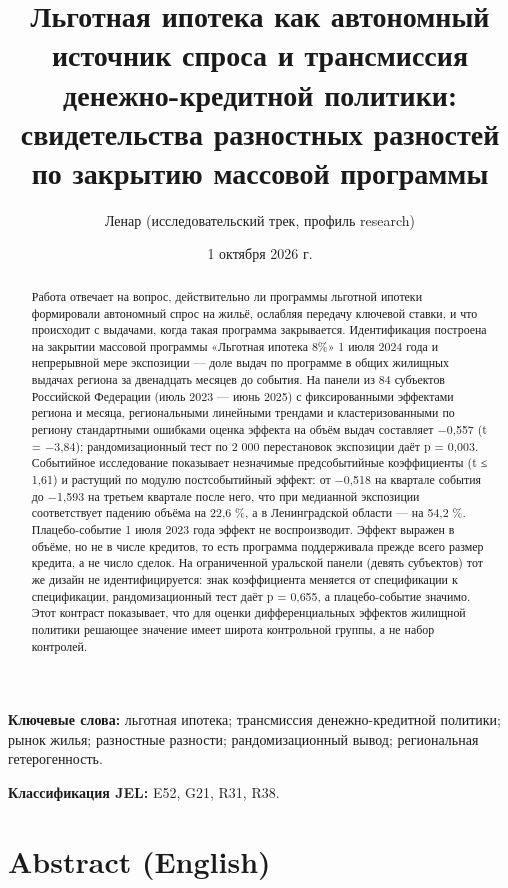 \documentclass[
  russian,
  11pt,
]{article}
\title{Льготная ипотека как автономный источник спроса и трансмиссия
денежно-кредитной политики: свидетельства разностных разностей по
закрытию массовой программы}
\author{Ленар (исследовательский трек, профиль research)}
\date{1 октября 2026 г.}
\begin{document}
\maketitle
\begin{abstract}
Работа отвечает на вопрос, действительно ли программы льготной ипотеки
формировали автономный спрос на жильё, ослабляя передачу ключевой
ставки, и что происходит с выдачами, когда такая программа закрывается.
Идентификация построена на закрытии массовой программы «Льготная ипотека
8\%» 1 июля 2024 года и непрерывной мере экспозиции --- доле выдач по
программе в общих жилищных выдачах региона за двенадцать месяцев до
события. На панели из 84 субъектов Российской Федерации (июль 2023 ---
июнь 2025) с фиксированными эффектами региона и месяца, региональными
линейными трендами и кластеризованными по региону стандартными ошибками
оценка эффекта на объём выдач составляет −0,557 (t = −3,84);
рандомизационный тест по 2 000 перестановок экспозиции даёт p = 0,003.
Событийное исследование показывает незначимые предсобытийные
коэффициенты (\textbar t\textbar{} ≤ 1,61) и растущий по модулю
постсобытийный эффект: от −0,518 на квартале события до −1,593 на
третьем квартале после него, что при медианной экспозиции соответствует
падению объёма на 22,6 \%, а в Ленинградской области --- на 54,2 \%.
Плацебо-событие 1 июля 2023 года эффект не воспроизводит. Эффект выражен
в объёме, но не в числе кредитов, то есть программа поддерживала прежде
всего размер кредита, а не число сделок. На ограниченной уральской
панели (девять субъектов) тот же дизайн не идентифицируется: знак
коэффициента меняется от спецификации к спецификации, рандомизационный
тест даёт p = 0,655, а плацебо-событие значимо. Этот контраст
показывает, что для оценки дифференциальных эффектов жилищной политики
решающее значение имеет широта контрольной группы, а не набор контролей.
\end{abstract}

\textbf{Ключевые слова:} льготная ипотека; трансмиссия денежно-кредитной
политики; рынок жилья; разностные разности; рандомизационный вывод;
региональная гетерогенность.

\textbf{Классификация JEL:} E52, G21, R31, R38.

\section{Abstract (English)}\label{abstract-english}
\end{document}

